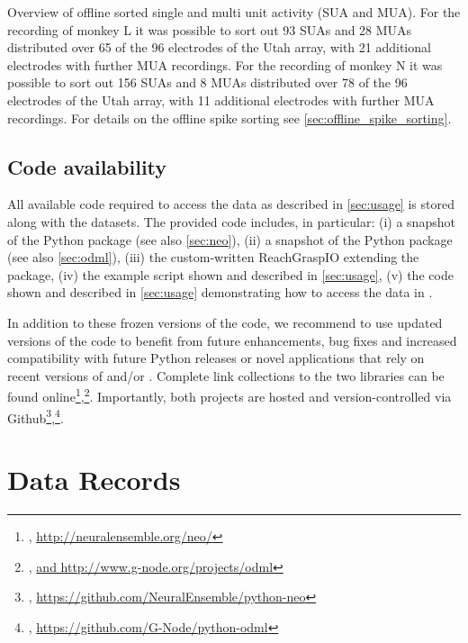 {\begin{table}
\caption[Overview of offline sorted single and multi unit activity (SUA and MUA)]{Overview of offline sorted single and multi unit activity (SUA and MUA). For the recording of monkey L it was possible to sort out 93 SUAs and 28 MUAs distributed over 65 of the 96 electrodes of the Utah array, with 21 additional electrodes with further MUA recordings. For the recording of monkey N it was possible to sort out 156 SUAs and 8 MUAs distributed over 78 of the
96 electrodes of the Utah array, with 11 additional electrodes with further MUA recordings. For details on the offline spike sorting see \cref{sec:offline_spike_sorting}.}
\label{tab:datafiles_unitactivity}
\end{table}

\subsection{Code availability}
\label{sec:code_availability}

All available code required to access the data as described in \cref{sec:usage} is stored along with the datasets. The provided code includes, in particular: (i) a snapshot of the Python   package (see also \cref{sec:neo}), (ii) a snapshot of the Python  package (see also \cref{sec:odml}), (iii) the custom-written ReachGraspIO extending the  package, (iv) the example script shown and described in \cref{sec:usage}, (v) the code shown and described in \cref{sec:usage} demonstrating how to access the data in .

In addition to these frozen versions of the code, we recommend to use updated versions of the code to benefit from future enhancements, bug fixes and increased compatibility with future Python releases or novel applications that rely on recent versions of  and/or . Complete link collections to the two libraries can be found online\footnote{, \url{http://neuralensemble.org/neo/}},\footnote{, \url{ and http://www.g-node.org/projects/odml}}. Importantly, both projects are hosted and version-controlled via Github\footnote{, \url{https://github.com/NeuralEnsemble/python-neo}},\footnote{, \url{https://github.com/G-Node/python-odml}}.

\section{Data Records}

}
